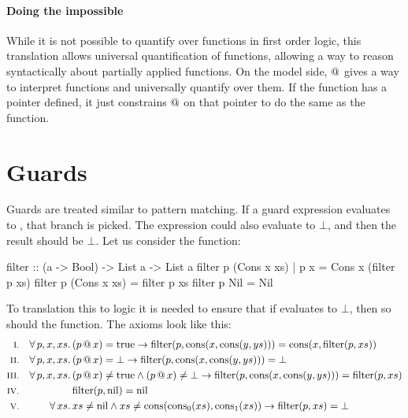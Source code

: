 \paragraph{Doing the impossible}
While it is not possible to quantify over functions in first order
logic, this translation allows universal quantification of functions,
allowing a way to reason syntactically about partially applied
functions. On the model side, $@$ gives a way to interpret
functions and universally quantify over them. If the function has a
pointer defined, it just constrains $@$ on that pointer to do the
same as the function.

\section{Guards}

Guards are treated similar to pattern matching. If a guard expression
evaluates to , that branch is picked. The expression could
also evaluate to $\bot$, and then the result should be $\bot$. Let us
consider the  function:

\begin{code}
filter :: (a -> Bool) -> List a -> List a
filter p (Cons x xs) | p x = Cons x (filter p xs)
filter p (Cons x xs)       = filter p xs
filter p Nil               = Nil
\end{code}


To translation this to logic it is needed to ensure that if 
evaluates to $\bot$, then so should the function. The axioms look
like this:
\newcommand\filter[2]{\fn{filter}(#1,#2)}
\begin{align*}
\rom{1} && \faaa{p}{x}{xs} & (\app{p}{x}) = \fn{true}                                  \rightarrow \filter{p}{\cons{x}{\cons{y}{ys}}} = \cons{x}{\filter{p}{xs}} \\
\rom{2} && \faaa{p}{x}{xs} & (\app{p}{x}) = \bot                                       \rightarrow \filter{p}{\cons{x}{\cons{y}{ys}}} = \bot \\
\rom{3} && \faaa{p}{x}{xs} & (\app{p}{x}) \neq \fn{true} \wedge (\app{p}{x}) \neq \bot \rightarrow \filter{p}{\cons{x}{\cons{y}{ys}}} = \filter{p}{xs} \\
\rom{4} &&                 & \filter{p}{\fn{nil}} = \fn{nil} \\
\rom{5} && \fa{xs}         & xs \neq \fn{nil} \wedge xs \neq \uncons{xs} \rightarrow \filter{p}{xs} = \bot
\end{align*}

